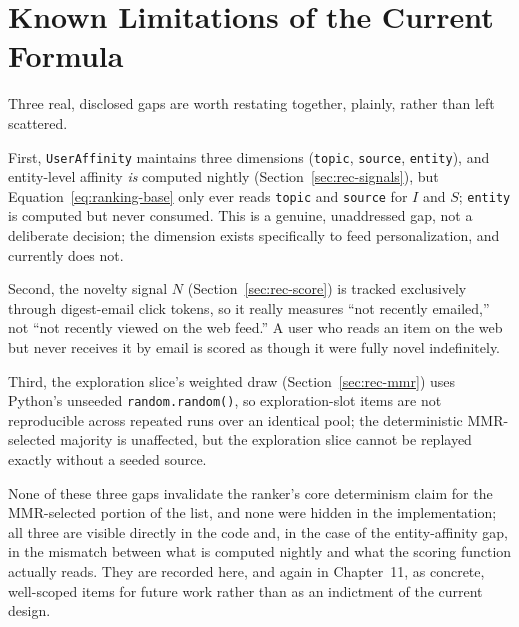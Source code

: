 \section{Known Limitations of the Current Formula}
\label{sec:rec-limitations}

Three real, disclosed gaps are worth restating together, plainly, rather than left scattered.

First, \texttt{UserAffinity} maintains three dimensions (\texttt{topic}, \texttt{source}, \texttt{entity}), and entity-level affinity \emph{is} computed nightly (Section~\ref{sec:rec-signals}), but Equation~\ref{eq:ranking-base} only ever reads \texttt{topic} and \texttt{source} for $I$ and $S$; \texttt{entity} is computed but never consumed. This is a genuine, unaddressed gap, not a deliberate decision; the dimension exists specifically to feed personalization, and currently does not.

Second, the novelty signal $N$ (Section~\ref{sec:rec-score}) is tracked exclusively through digest-email click tokens, so it really measures ``not recently emailed,'' not ``not recently viewed on the web feed.'' A user who reads an item on the web but never receives it by email is scored as though it were fully novel indefinitely.

Third, the exploration slice's weighted draw (Section~\ref{sec:rec-mmr}) uses Python's unseeded \texttt{random.random()}, so exploration-slot items are not reproducible across repeated runs over an identical pool; the deterministic MMR-selected majority is unaffected, but the exploration slice cannot be replayed exactly without a seeded source.

None of these three gaps invalidate the ranker's core determinism claim for the MMR-selected portion of the list, and none were hidden in the implementation; all three are visible directly in the code and, in the case of the entity-affinity gap, in the mismatch between what is computed nightly and what the scoring function actually reads. They are recorded here, and again in Chapter~11, as concrete, well-scoped items for future work rather than as an indictment of the current design.
